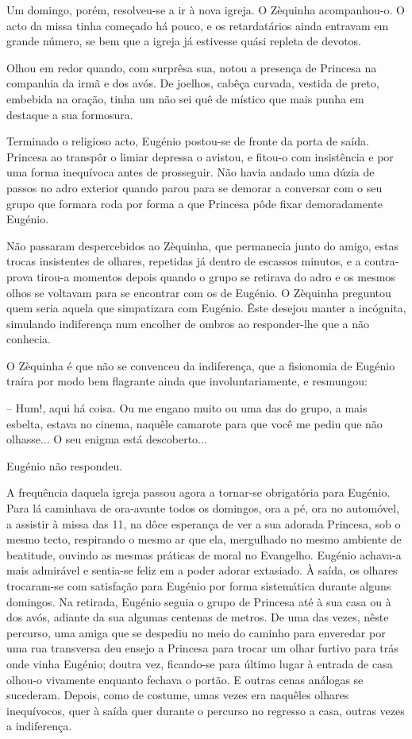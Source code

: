 \documentclass[9pt]{article}
\begin{document}
Um domingo, porém, resolveu-se a ir à nova igreja. O Zèquinha acompanhou-o. O acto da missa tinha começado há pouco, e os retardatários ainda entravam
em gran\-de número, se bem que a igreja já estivesse quási repleta de devotos.

O\-lhou em redor quan\-do, com surprêsa sua, notou a presença de Princesa
na companhia da irmã e dos avós. De joe\-lhos, cabêça curvada, vestida de preto,
embebida na ora\-ção, tinha um não sei quê de místico que mais punha em destaque a sua formosura.

Terminado o religioso acto, Eugé\-nio postou-se de fronte da porta de
saída. Princesa ao transpôr o limiar depressa o avistou, e fitou-o com
insistência e por uma forma inequívoca antes de prosseguir. Não havia andado uma dúzia de passos no adro exterior quan\-do parou para se demorar a
conversar com o seu grupo que formara roda por forma a que Princesa pôde
fixar demoradamente Eugé\-nio.

Não passaram despercebidos ao Zèquinha, que permanecia junto do amigo,
estas trocas insistentes de o\-lhares, repetidas já dentro de escassos minutos, e a contra-prova tirou-a momentos depois quan\-do o grupo se retirava
do adro e os mesmos o\-lhos se voltavam para se encontrar com os de Eugé\-nio.
O Zèquinha preguntou quem seria aquela que simpatizara com Eugé\-nio.
Êste desejou manter a incógnita, simulando indiferença num enco\-lher de ombros ao responder-\-lhe que a não conhecia.

O Zèquinha é que não se convenceu da indiferença, que a fisionomia de
Eugé\-nio traíra por modo bem flagrante ainda que involuntariamente, e resmungou:

-- Hum!, aqui há coisa. Ou me engano muito ou uma das do grupo, a mais
esbelta, estava no cinema, na\-quê\-le camarote para que você me pediu que não
o\-lhasse...  O seu enigma está descoberto...

Eugé\-nio não respondeu.

A frequência daquela igreja passou agora a tornar-se obrigatória para Eugé\-nio. Para lá caminhava de ora-avante todos os domingos, ora a pé,
ora no automóvel, a assistir à missa das 11, na dôce esperan\-ça de ver a
sua adorada Princesa, sob o mesmo tecto, respirando o mesmo ar que ela, mergu\-lhado no mesmo ambiente de beatitude, ouvindo as mesmas práticas de moral no Evange\-lho. Eugé\-nio achava-a mais admi\-rável e sentia-se feliz em a poder adorar extasiado.
À saída, os o\-lhares trocaram-se com satisfa\-ção para Eugé\-nio por
forma sistemática durante alguns domingos. Na retirada, Eugé\-nio seguia
o grupo de Princesa até à sua casa ou à dos avós, adiante da sua algumas
centenas de metros. De uma das vezes, nês\-te percurso, uma amiga que se despediu no meio do caminho para enveredar por uma rua transversa deu ensejo
a Princesa para trocar um o\-lhar furtivo para trás onde vinha Eugé\-nio; doutra vez, fi\-cando-se para último lugar à entrada de casa o\-lhou-o vivamente
enquanto fechava o portão. E outras cenas análogas se sucederam. Depois,
como de costume, umas vezes era na\-quê\-les o\-lhares inequívocos, quer à saída
quer durante o percurso no regresso a casa, outras vezes a indiferença.
\end{document}
